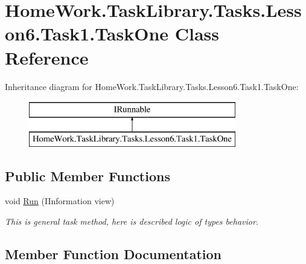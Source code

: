 \hypertarget{class_home_work_1_1_task_library_1_1_tasks_1_1_lesson6_1_1_task1_1_1_task_one}{}\section{Home\+Work.\+Task\+Library.\+Tasks.\+Lesson6.\+Task1.\+Task\+One Class Reference}
\label{class_home_work_1_1_task_library_1_1_tasks_1_1_lesson6_1_1_task1_1_1_task_one}
Inheritance diagram for Home\+Work.\+Task\+Library.\+Tasks.\+Lesson6.\+Task1.\+Task\+One\+:\begin{figure}[H]
\begin{center}
\leavevmode
\includegraphics[height=2.000000cm]{class_home_work_1_1_task_library_1_1_tasks_1_1_lesson6_1_1_task1_1_1_task_one}
\end{center}
\end{figure}
\subsection*{Public Member Functions}
\begin{DoxyCompactItemize}
\item 
void \mbox{\hyperlink{class_home_work_1_1_task_library_1_1_tasks_1_1_lesson6_1_1_task1_1_1_task_one_a9c2384f8284b53f0de51e04d952150b0}{Run}} (I\+Information view)
\begin{DoxyCompactList}\small\item\em This is general task method, here is described logic of types behavior. \end{DoxyCompactList}\end{DoxyCompactItemize}


\subsection{Member Function Documentation}
\mbox{\label{class_home_work_1_1_task_library_1_1_tasks_1_1_lesson6_1_1_task1_1_1_task_one_a9c2384f8284b53f0de51e04d952150b0}} 
